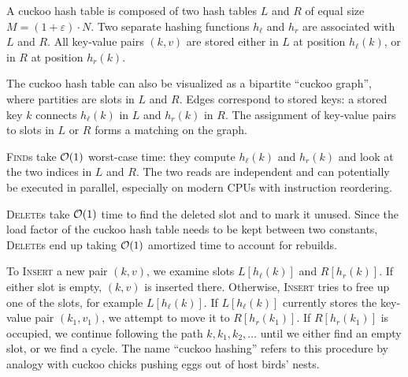 A cuckoo hash table is composed of two hash tables $L$ and $R$ of equal size
$M=(1+\varepsilon)\cdot N$.
Two separate hashing functions $h_\ell$ and $h_r$ are associated with $L$ and $R$.
All key-value pairs $(k,v)$ are stored either in $L$ at position $h_\ell(k)$, or
in $R$ at position $h_r(k)$.

The cuckoo hash table can also be visualized as a bipartite ``cuckoo graph'',
where partities are slots in $L$ and $R$. Edges correspond to stored keys:
a stored key $k$ connects $h_\ell(k)$ in $L$ and $h_r(k)$ in $R$. The assignment
of key-value pairs to slots in $L$ or $R$ forms a matching on the graph.

\textsc{Find}s take $\mathcal{O}(1)$ worst-case time: they compute $h_\ell(k)$ and $h_r(k)$
and look at the two indices in $L$ and $R$. The two reads are independent and
can potentially be executed in parallel, especially on modern CPUs with
instruction reordering.

\textsc{Delete}s take $\mathcal{O}(1)$ time to find the deleted slot and to mark
it unused. Since the load factor of the cuckoo hash table needs to be kept
between two constants, \textsc{Delete}s end up taking $\mathcal{O}(1)$ amortized time
to account for rebuilds.

To \textsc{Insert} a new pair $(k,v)$, we examine slots $L[h_\ell(k)]$ and
$R[h_r(k)]$. If either slot is empty, $(k,v)$ is inserted there. Otherwise,
\textsc{Insert} tries to free up one of the slots, for example $L[h_\ell(k)]$.
If $L[h_\ell(k)]$ currently stores the key-value pair $(k_1,v_1)$, we attempt to
move it to $R[h_r(k_1)]$. If $R[h_r(k_1)]$ is occupied, we continue following
the path $k,k_1,k_2,\ldots$ until we either find an empty slot, or we find
a cycle.
The name ``cuckoo hashing'' refers to this procedure by analogy with
cuckoo chicks pushing eggs out of host birds' nests.

